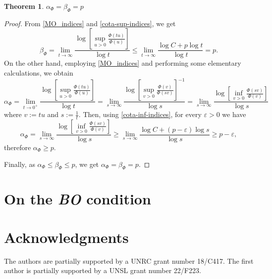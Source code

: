 \documentclass[twoside]{article}
\newtheorem{thm}{Theorem}[section]
\theoremstyle{remark}
\renewcommand{\leq}{\leqslant}
\renewcommand{\geq}{\geqslant}
\begin{document}
\begin{thm}
$\alpha_{\Phi}=\beta_{\Phi}=p$
\end{thm}

\begin{proof}
From \eqref{MO_indices} and \eqref{cota-sup-indices}, we get
\[
\beta_{\Phi}=\lim\limits_{t \to \infty} \frac{\log\left[\sup\limits_{u>0} \frac{\Phi(tu)}{\Phi(u)}\right]}{\log t}
\leq
\lim \limits_{t \to \infty} \frac{\log C+p\log t}{\log t}=p.
\]
On the other hand, employing \eqref{MO_indices} and performing some elementary calculations, we obtain
\[
\alpha_{\Phi}=
\lim\limits_{t \to 0^+} \frac{\log\left[\sup\limits_{u>0} \frac{\Phi(tu)}{\Phi(u)}\right]}{\log t}=
\lim\limits_{s \to \infty} \frac{\log\left[\sup\limits_{v>0} \frac{\Phi(v)}{\Phi(sv)}\right]^{-1}}{\log s}=
\lim\limits_{s \to \infty} \frac{\log\left[\inf\limits_{v>0} \frac{\Phi(sv)}{\Phi(v)}\right]}{\log s}
\]
where $v:=tu$ and $s:=\frac{1}{t}$.
Then, using \eqref{cota-inf-indices},  for every $\varepsilon>0$ we have
\[
\alpha_{\Phi}=
\lim\limits_{s \to \infty} \frac{\log\left[\inf\limits_{v>0} \frac{\Phi(sv)}{\Phi(v)}\right]}{\log s}\geq
\lim\limits_{s \to \infty} \frac{\log C+(p-\varepsilon)\log s}{\log s}\geq p-\varepsilon,
\]
therefore $\alpha_{\Phi}\geq p$.

Finally, as $\alpha_{\Phi}\leq \beta_{\Phi}\leq p$, we get
$\alpha_{\Phi}=\beta_{\Phi}=p$.
\end{proof}




\section{On the \textit{BO} condition}\label{sec:BO}

\section*{Acknowledgments}
The authors are partially supported by a UNRC grant number 18/C417. The first author is  partially supported by a  UNSL grant number 22/F223. 




  
 
\end{document}
